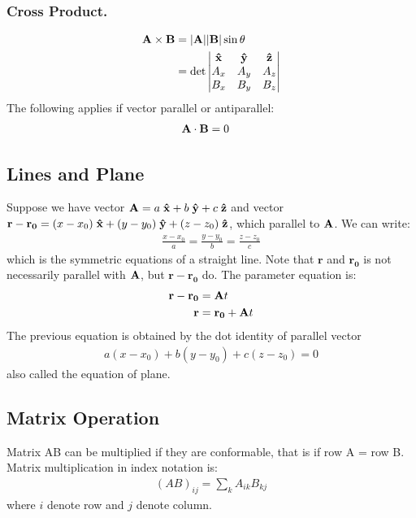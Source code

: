 \documentclass[../main.tex]{subfiles}
\begin{document}
\subsubsection*{Cross Product.}
\begin{align*}
    \mathbf{A}\times\mathbf{B}&=|\mathbf{A}||\mathbf{B}|\sin\theta\\
    &=\det\begin{vmatrix}
        \mathbf{\hat{x}}&\mathbf{\hat{y}}&\mathbf{\hat{z}}\\
        A_x&A_y&A_z\\
        B_x&B_y&B_z
    \end{vmatrix}
\end{align*}
The following applies if vector parallel or antiparallel:
\begin{align*}
    \mathbf{A}\cdot\mathbf{B}&=0
\end{align*}

\subsection*{Lines and Plane}
Suppose we have vector $\mathbf{A}=a\;\mathbf{\hat{x}}+b\;\mathbf{\hat{y}} +c\;\mathbf{\hat{z}}$ and vector $\mathbf{r}-\mathbf{r_0}=(x-x_0)\;\mathbf{\hat{x}}+(y-y_0)\;\mathbf{\hat{y}} +(z-z_0)\;\mathbf{\hat{z}}$, which parallel to $\mathbf{A}$.
We can write:
\begin{align*}
    \frac{x-x_0}{a}=\frac{y-y_0}{b}=\frac{z-z_0}{c}
\end{align*}
which is the symmetric equations of a straight line. 
Note that $\mathbf{r}$ and $\mathbf{r_0}$ is not necessarily parallel with $\mathbf{A}$, but $\mathbf{r}-\mathbf{r_0}$ do.
The parameter equation is:
\begin{align*}
    \mathbf{r}-\mathbf{r_0}&=\mathbf{A} t\\
    \mathbf{r}&=\mathbf{r_0}+\mathbf{A} t
\end{align*}
The previous equation is obtained by the dot identity of parallel vector
\begin{align*}
    a(x-x_0)+b(y-y_0)+c(z-z_0)=0
\end{align*}
also called the equation of plane.

\subsection*{Matrix Operation}
Matrix AB can be multiplied if they are conformable, that is if row A = row B. 
Matrix multiplication in index notation is:
\begin{align*}
    (AB)_{ij}=\sum_{k}A_{ik}B_{kj}
\end{align*}
where $i$ denote row and $j$ denote column.
\end{document}
